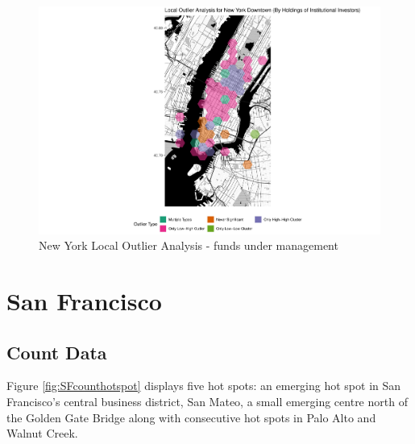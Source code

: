 \begin{figure}
	\centering
	\includegraphics[width=1\linewidth]{Figures/ChapterIV/NY_Money_LO_Downtown}
	\caption[Downtown New York Local Outlier Analysis - Funds Under Management 2013-2018]{New York Local Outlier Analysis - funds under management}
	\label{fig:NYClocaloutlier_Downtown}
\end{figure}


\section{San Francisco}


\subsection{Count Data}

Figure \ref{fig:SFcounthotspot} displays five hot spots: an emerging hot spot in San Francisco's central business district, San Mateo, a small emerging centre north of the Golden Gate Bridge along with consecutive hot spots in Palo Alto and Walnut Creek.   

